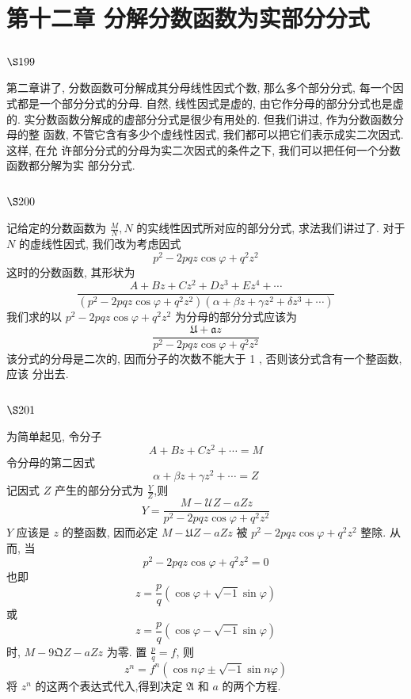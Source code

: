\chapter{第十二章 分解分数函数为实部分分式}

\section{$\S 199$}

第二章讲了, 分数函数可分解成其分母线性因式个数, 那么多个部分分式, 每一个因 式都是一个部分分式的分母. 自然, 线性因式是虚的, 由它作分母的部分分式也是虚的. 实分数函数分解成的虚部分分式是很少有用处的. 但我们讲过, 作为分数函数分母的整 函数, 不管它含有多少个虚线性因式, 我们都可以把它们表示成实二次因式. 这样, 在允 许部分分式的分母为实二次因式的条件之下, 我们可以把任何一个分数函数都分解为实 部分分式.

\section{$\S 200$}

记给定的分数函数为 $\frac{M}{N}, N$ 的实线性因式所对应的部分分式, 求法我们讲过了. 对于 $N$ 的虚线性因式, 我们改为考虑因式
\[
p^{2}-2 p q z \cos \varphi+q^{2} z^{2}
\]
这时的分数函数, 其形状为
\[
\frac{A+B z+C z^{2}+D z^{3}+E z^{4}+\cdots}{\left(p^{2}-2 p q z \cos \varphi+q^{2} z^{2}\right)\left(\alpha+\beta z+\gamma z^{2}+\delta z^{3}+\cdots\right)}
\]
我们求的以 $p^{2}-2 p q z \cos \varphi+q^{2} z^{2}$ 为分母的部分分式应该为
\[
\frac{\mathfrak{U}+\mathfrak{a} z}{p^{2}-2 p q z \cos \varphi+q^{2} z^{2}}
\]
该分式的分母是二次的, 因而分子的次数不能大于 1 , 否则该分式含有一个整函数, 应该 分出去.

\section{$\S 201$}

为简单起见, 令分子
\[
A+B z+C z^{2}+\cdots=M
\]
令分母的第二因式 
\[
\alpha+\beta z+\gamma z^{2}+\cdots=Z
\]
记因式 $Z$ 产生的部分分式为 $\frac{Y}{Z}$,则
\[
Y=\frac{M-\mathscr{U} Z-a Z z}{p^{2}-2 p q z \cos \varphi+q^{2} z^{2}}
\]
$Y$ 应该是 $z$ 的整函数, 因而必定 $M-\mathfrak{U} Z-a Z z$ 被 $p^{2}-2 p q z \cos \varphi+q^{2} z^{2}$ 整除. 从而, 当
\[
p^{2}-2 p q z \cos \varphi+q^{2} z^{2}=0
\]
也即
\[
z=\frac{p}{q}(\cos \varphi+\sqrt{-1} \sin \varphi)
\]
或
\[
z=\frac{p}{q}(\cos \varphi-\sqrt{-1} \sin \varphi)
\]
时, $M-9 \mathfrak{Q} Z-a Z z$ 为零. 置 $\frac{p}{q}=f$, 则
\[
z^{n}=f^{n}(\cos n \varphi \pm \sqrt{-1} \sin n \varphi)
\]
将 $z^{n}$ 的这两个表达式代入,得到决定 $\mathfrak{A}$ 和 $a$ 的两个方程.

